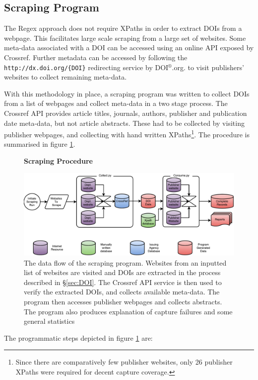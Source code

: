 \subsection{Scraping Program}
\label{sec:SCRAPING_PROGRAM}
The Regex approach does not require XPaths in order to extract DOIs from a webpage. This facilitates large scale scraping from a large set of websites. Some meta-data associated with a DOI can be accessed using an online API exposed by Crossref. Further metadata can be accessed by following the \texttt{http://dx.doi.org/\{DOI\}} redirecting service by DOI$^{\circledR}$.org. to visit publishers' websites to collect remaining meta-data. 

With this methodology in place, a scraping program was written to collect DOIs from a list of webpages and collect meta-data in a two stage process. The Crossref API provides article titles, journals, authors, publisher and publication date meta-data, but not article abstracts. These had to be collected by visiting publisher webpages, and collecting with hand written XPaths\footnote{Since there are comparatively few publisher websites, only 26 publisher XPaths were required for decent capture coverage.}. The procedure is summarised in figure \ref{fig:Cherry}.
\begin{figure}[H]
    \centering
    \textbf{Scraping Procedure}\par\medskip
    \includegraphics[width=\textwidth]{Data_Acquisition/Cherry2.pdf}
    \caption[Data Flow in Scraping Procedure]{The data flow of the scraping program. Websites from an inputted list of websites are visited and DOIs are extracted in the process described in  \S\ref{sec:DOI}. The Crossref API service is then used to verify the extracted DOIs, and collects available meta-data. The program then accesses publisher webpages and collects abstracts. The program also produces explanation of capture failures and some general statistics}
     \label{fig:Cherry}
\end{figure}
The programmatic steps depicted in figure \ref{fig:Cherry} are:
